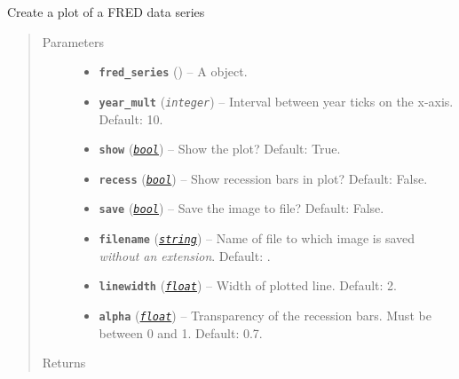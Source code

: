 \documentclass[letterpaper,10pt,openany,oneside]{sphinxmanual}
\begin{document}
\begin{fulllineitems}
\label{additional_functions:fredpy.quickplot}
Create a plot of a FRED data series
\begin{quote}\begin{description}
\item[{Parameters}] \leavevmode\begin{itemize}
\item {} 
\textbf{\texttt{fred\_series}} ({\hyperref[series_class:fredpy.series]{}}) -- A  object.

\item {} 
\textbf{\texttt{year\_mult}} (\emph{\texttt{integer}}) -- Interval between year ticks on the x-axis. Default: 10.

\item {} 
\textbf{\texttt{show}} (\href{https://docs.python.org/library/functions.html\#bool}{\emph{\texttt{bool}}}) -- Show the plot? Default: True.

\item {} 
\textbf{\texttt{recess}} (\href{https://docs.python.org/library/functions.html\#bool}{\emph{\texttt{bool}}}) -- Show recession bars in plot? Default: False.

\item {} 
\textbf{\texttt{save}} (\href{https://docs.python.org/library/functions.html\#bool}{\emph{\texttt{bool}}}) -- Save the image to file? Default: False.

\item {} 
\textbf{\texttt{filename}} (\href{https://docs.python.org/library/string.html\#module-string}{\emph{\texttt{string}}}) -- Name of file to which image is saved \emph{without an extension}. Default: .

\item {} 
\textbf{\texttt{linewidth}} (\href{https://docs.python.org/library/functions.html\#float}{\emph{\texttt{float}}}) -- Width of plotted line. Default: 2.

\item {} 
\textbf{\texttt{alpha}} (\href{https://docs.python.org/library/functions.html\#float}{\emph{\texttt{float}}}) -- Transparency of the recession bars. Must be between 0 and 1. Default: 0.7.

\end{itemize}

\item[{Returns}] \leavevmode


\end{description}\end{quote}

\end{fulllineitems}
\end{document}
